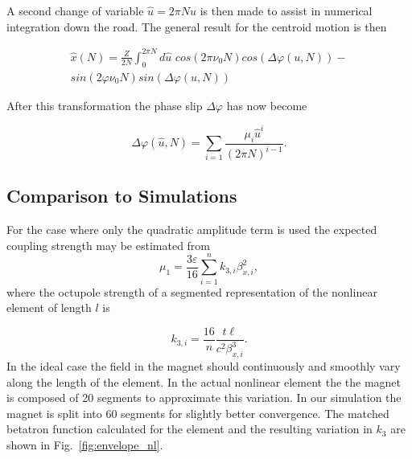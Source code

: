 \documentclass[aps,prstab,twocolumn, groupedaddress]{revtex4-1}
\begin{document}
A second change of variable $\hat{u} = 2 \pi N u$ is then made to assist in numerical 
integration down the road. The general result for the centroid motion is then

\begin{multline} \label{eq:general_centroid}
\hat{x}(N) = \frac{Z}{2 N} \int_{0}^{2\pi N} d\hat{u} \,\, cos(2 \pi \nu_0 N)cos(\Delta 
\varphi(u, 
N)) - \\
sin(2 \varphi 
\nu_0 N) sin(\Delta \varphi(u, N))
\end{multline}

After this transformation the phase slip $\Delta \varphi$ has now become

\begin{equation} \label{eq:phase_slip_2} 
\Delta \varphi(\hat{u}, N) = \sum_{i=1} \frac{\mu_i \hat{u}^{i}}{(2 \pi N)^{i - 1}}.
\end{equation}

\subsection{Comparison to Simulations}
For the case where only the quadratic amplitude term is used the expected coupling 
strength may be estimated from \cite{talman:86}
\begin{equation} \label{eq:octupole_coeff}
\mu_1 = \frac{3 \varepsilon}{16} \sum_{i=1}^n k_{3, i}\beta_{x, i}^2,
\end{equation}
where the octupole strength of a segmented representation of the nonlinear element of 
length $l$ is

\begin{equation}
k_{3,i} = \frac{16}{n} \frac{t \ell}{c^2\beta^3_{x,i} }.
\end{equation}
In the ideal case the field in the magnet should continuously and smoothly vary along the 
length of the element. In the actual nonlinear element the the magnet is composed of 20 
segments to approximate this variation. In our simulation the magnet is split into 60 
segments for slightly better convergence. The  matched betatron function calculated for 
the element and the resulting variation in $k_3$ are shown in Fig.~\ref{fig:envelope_nl}.

\end{document}
